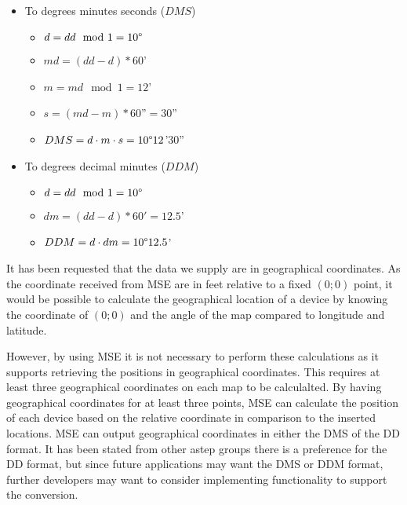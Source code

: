 \begin{itemize}
\begin{itemize}
		\item To degrees minutes seconds ($DMS$)
		\begin{itemize}
			\setlength\itemsep{0.00005em}
			\item $ d = dd \mod 1 = 10\degree $
			\item $ md = (dd - d) * 60$' 
			\item $ m = md \mod 1 = 12$' 
			\item $ s = (md - m) * 60$''$ = 30$''
			\item $ DMS = d \cdot m \cdot s = 10\degree 12$'$ 30$'' 
		\end{itemize}
		\item To degrees decimal minutes ($DDM$)
		\begin{itemize}
			\setlength\itemsep{0.00005em}
			\item $ d = dd \mod 1 = 10\degree $
			\item $ dm = (dd - d) * 60' = 12.5$'
			\item $ DDM = d \cdot dm = 10\degree 12.5$'
		\end{itemize}
	\end{itemize}
\end{itemize}

It has been requested that the data we supply are in geographical coordinates.
As the coordinate received from MSE are in feet relative to a fixed $(0;0)$ point, it would be possible to calculate the geographical location of a device by knowing the coordinate of $(0;0)$ and the angle of the map compared to longitude and latitude. 

However, by using MSE it is not necessary to perform these calculations as it supports retrieving the positions in geographical coordinates. This requires at least three geographical coordinates on each map to be calculalted. By having geographical coordinates for at least three points, MSE can calculate the position of each device based on the relative coordinate in comparison to the inserted locations\cite{geo_cisco}. 
MSE can output geographical coordinates in either the DMS of the DD format\cite{cisco_geo_type}. It has been stated from other astep groups there is a preference for the DD format, but since future applications may want the DMS or DDM format, further developers may want to consider implementing functionality to support the conversion.